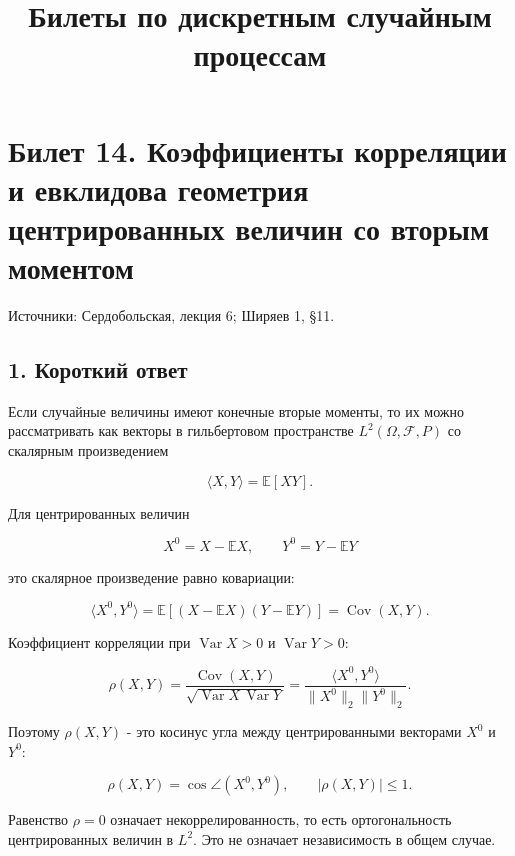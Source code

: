\documentclass[
  11pt,
  a4paper,
]{article}
\title{Билеты по дискретным случайным процессам}
\author{}
\date{}
\begin{document}
\maketitle

\section{Билет 14. Коэффициенты корреляции и евклидова геометрия
центрированных величин со вторым
моментом}\label{ux431ux438ux43bux435ux442-14.-ux43aux43eux44dux444ux444ux438ux446ux438ux435ux43dux442ux44b-ux43aux43eux440ux440ux435ux43bux44fux446ux438ux438-ux438-ux435ux432ux43aux43bux438ux434ux43eux432ux430-ux433ux435ux43eux43cux435ux442ux440ux438ux44f-ux446ux435ux43dux442ux440ux438ux440ux43eux432ux430ux43dux43dux44bux445-ux432ux435ux43bux438ux447ux438ux43d-ux441ux43e-ux432ux442ux43eux440ux44bux43c-ux43cux43eux43cux435ux43dux442ux43eux43c}

Источники: Сердобольская, лекция 6; Ширяев 1, §11.

\subsection{1. Короткий
ответ}\label{ux43aux43eux440ux43eux442ux43aux438ux439-ux43eux442ux432ux435ux442}

Если случайные величины имеют конечные вторые моменты, то их можно
рассматривать как векторы в гильбертовом пространстве
\(L^2(\Omega,\mathcal F,P)\) со скалярным произведением

\[
\langle X,Y\rangle=\mathbb E[XY].
\]

Для центрированных величин

\[
X^0=X-\mathbb EX,\qquad Y^0=Y-\mathbb EY
\]

это скалярное произведение равно ковариации:

\[
\langle X^0,Y^0\rangle
=
\mathbb E[(X-\mathbb EX)(Y-\mathbb EY)]
=
\operatorname{Cov}(X,Y).
\]

Коэффициент корреляции при \(\operatorname{Var}X>0\) и
\(\operatorname{Var}Y>0\):

\[
\rho(X,Y)
=
\frac{\operatorname{Cov}(X,Y)}
{\sqrt{\operatorname{Var}X\,\operatorname{Var}Y}}
=
\frac{\langle X^0,Y^0\rangle}{\|X^0\|_2\|Y^0\|_2}.
\]

Поэтому \(\rho(X,Y)\) - это косинус угла между центрированными векторами
\(X^0\) и \(Y^0\):

\[
\rho(X,Y)=\cos\angle(X^0,Y^0),
\qquad
|\rho(X,Y)|\le1.
\]

Равенство \(\rho=0\) означает некоррелированность, то есть
ортогональность центрированных величин в \(L^2\). Это не означает
независимость в общем случае.
\end{document}
